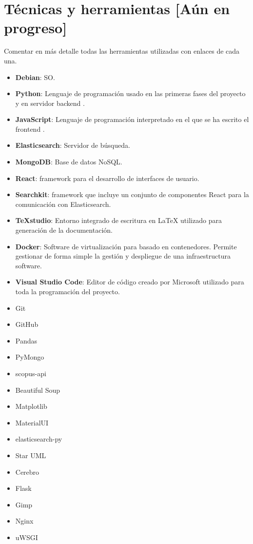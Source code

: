 \chapter{Técnicas y herramientas [Aún en progreso]}
\label{ch:herramientas}

Comentar en más detalle todas las herramientas utilizadas con enlaces de cada una.

\begin{itemize}
	\item \textbf{Debian}: \acrfull{SO}.
	\item \textbf{Python}: Lenguaje de programación usado en las primeras fases del proyecto y en servidor \gls{backend} .
	\item \textbf{JavaScript}: Lenguaje de programación interpretado en el que se ha escrito el \gls{frontend} .
	\item \textbf{Elasticsearch}: Servidor de búsqueda.
	\item \textbf{MongoDB}: Base de datos NoSQL.
	\item \textbf{React}:  \Gls{framework} para el desarrollo de interfaces de usuario.
	\item \textbf{Searchkit}: \Gls{framework} que incluye un conjunto de componentes React para la comunicación con Elasticsearch.
	\item \textbf{TeXstudio}: Entorno integrado de escritura en \LaTeX{} utilizado para generación de la documentación.
	\item \textbf{Docker}: Software de virtualización para basado en contenedores. Permite gestionar de forma simple la gestión y despliegue de una infraestructura software.
	\item \textbf{Visual Studio Code}: Editor de código creado por Microsoft utilizado para toda la programación del proyecto.
	\item Git
	\item GitHub
	\item Pandas
	\item PyMongo
	\item scopus-api
	\item Beautiful Soup
	\item Matplotlib
	\item MaterialUI
	\item elasticsearch-py
	\item Star UML
	\item Cerebro
	\item Flask
	\item Gimp
	\item Nginx
	\item uWSGI
\end{itemize}